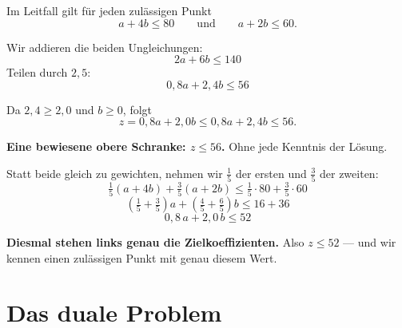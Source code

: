 \begin{merksatz}
Im Leitfall gilt für jeden zulässigen Punkt
\[ a + 4b \le 80 \qquad\text{und}\qquad a + 2b \le 60 . \]

Wir addieren die beiden Ungleichungen:
\[ 2a + 6b \le 140 \]
Teilen durch $2{,}5$:
\[ 0{,}8a + 2{,}4b \le 56 \]

Da $2{,}4 \ge 2{,}0$ und $b \ge 0$, folgt
\[ z = 0{,}8a + 2{,}0b \le 0{,}8a + 2{,}4b \le 56 . \]

\begin{center}
\begin{minipage}{0.9\textwidth}
\textbf{Eine bewiesene obere Schranke: $z \le 56$.} Ohne jede Kenntnis der Lösung.
\end{minipage}
\end{center}

Statt beide gleich zu gewichten, nehmen wir $\frac15$ der ersten und $\frac35$ der zweiten:
\[ \tfrac15(a+4b) + \tfrac35(a+2b) \le \tfrac15\cdot80 + \tfrac35\cdot60 \]
\[ \left(\tfrac15+\tfrac35\right)a + \left(\tfrac45+\tfrac65\right)b \le 16+36 \]
\[ 0{,}8\,a + 2{,}0\,b \le 52 \]

\begin{center}
\begin{minipage}{0.9\textwidth}
\textbf{Diesmal stehen links genau die Zielkoeffizienten.} Also $z \le 52$ --- und wir kennen einen zulässigen Punkt mit genau diesem Wert.
\end{minipage}
\end{center}

\begin{center}
\begin{minipage}{0.88\textwidth}
\end{minipage}
\end{center}
\end{merksatz}

\section{Das duale Problem}


